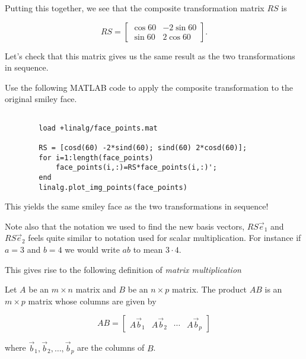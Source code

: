 \documentclass{ximera}
\begin{document}
\begin{exploration}
\begin{example}
\begin{question}
\begin{solution}
        \end{solution}

    \end{question}

    Putting this together, we see that the composite transformation matrix $RS$ is 
    
    $$RS=\begin{bmatrix} \cos 60 & -2\sin 60 \\ \sin 60 & 2\cos 60 \end{bmatrix}.$$

    Let's check that this matrix gives us the same result as the two transformations in sequence.

    Use the following MATLAB code to apply the composite transformation to the original smiley face.

    \begin{verbatim}

        load +linalg/face_points.mat

        RS = [cosd(60) -2*sind(60); sind(60) 2*cosd(60)];
        for i=1:length(face_points)
            face_points(i,:)=RS*face_points(i,:)';
        end
        linalg.plot_img_points(face_points)
    \end{verbatim}

    This yields the same smiley face as the two transformations in sequence!


    \end{example}

    \begin{remark}

        Note also that the notation we used to find the new basis vectors, $RS\vec{e}_1$ and $RS\vec{e}_2$ feels quite similar to notation used for scalar multiplication. For instance if $a=3$ and $b=4$ we would write $ab$ to mean $3\cdot 4$.

        This gives rise to the following definition of \emph{matrix multiplication}

        \begin{definition}

            Let $A$ be an $m\times n$ matrix and $B$ be an $n\times p$ matrix. The product $AB$ is an $m\times p$ matrix whose columns are given by 

            $$AB=\begin{bmatrix} A\vec{b}_1 & A\vec{b}_2 & \cdots & A\vec{b}_p \end{bmatrix}$$

            where $\vec{b}_1,\vec{b}_2,\ldots,\vec{b}_p$ are the columns of $B$.


\end{definition}
\end{remark}
\end{exploration}
\end{document}
